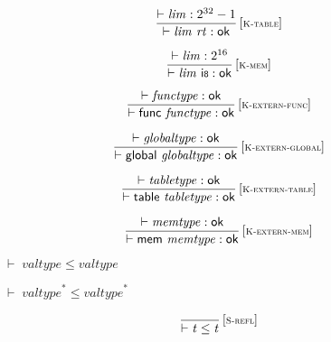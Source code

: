 $$
\begin{array}{@{}c@{}}\displaystyle
\frac{
{ \vdash }\;{\mathit{lim}} : {2^{32}} - 1
}{
{ \vdash }\;{\mathit{lim}}~{\mathit{rt}} : \mathsf{ok}
} \, {[\textsc{\scriptsize K{-}table}]}
\qquad
\end{array}
$$

$$
\begin{array}{@{}c@{}}\displaystyle
\frac{
{ \vdash }\;{\mathit{lim}} : {2^{16}}
}{
{ \vdash }\;{\mathit{lim}}~\mathsf{i{\scriptstyle8}} : \mathsf{ok}
} \, {[\textsc{\scriptsize K{-}mem}]}
\qquad
\end{array}
$$

\vspace{1ex}

$$
\begin{array}{@{}c@{}}\displaystyle
\frac{
{ \vdash }\;{\mathit{functype}} : \mathsf{ok}
}{
{ \vdash }\;\mathsf{func}~{\mathit{functype}} : \mathsf{ok}
} \, {[\textsc{\scriptsize K{-}extern{-}func}]}
\qquad
\end{array}
$$

$$
\begin{array}{@{}c@{}}\displaystyle
\frac{
{ \vdash }\;{\mathit{globaltype}} : \mathsf{ok}
}{
{ \vdash }\;\mathsf{global}~{\mathit{globaltype}} : \mathsf{ok}
} \, {[\textsc{\scriptsize K{-}extern{-}global}]}
\qquad
\end{array}
$$

$$
\begin{array}{@{}c@{}}\displaystyle
\frac{
{ \vdash }\;{\mathit{tabletype}} : \mathsf{ok}
}{
{ \vdash }\;\mathsf{table}~{\mathit{tabletype}} : \mathsf{ok}
} \, {[\textsc{\scriptsize K{-}extern{-}table}]}
\qquad
\end{array}
$$

$$
\begin{array}{@{}c@{}}\displaystyle
\frac{
{ \vdash }\;{\mathit{memtype}} : \mathsf{ok}
}{
{ \vdash }\;\mathsf{mem}~{\mathit{memtype}} : \mathsf{ok}
} \, {[\textsc{\scriptsize K{-}extern{-}mem}]}
\qquad
\end{array}
$$

\vspace{1ex}

\vspace{1ex}

$\boxed{{ \vdash }\;{\mathit{valtype}} \leq {\mathit{valtype}}}$

$\boxed{{ \vdash }\;{{\mathit{valtype}}^\ast} \leq {{\mathit{valtype}}^\ast}}$

$$
\begin{array}{@{}c@{}}\displaystyle
\frac{
}{
{ \vdash }\;{\mathit{t}} \leq {\mathit{t}}
} \, {[\textsc{\scriptsize S{-}refl}]}
\qquad
\end{array}
$$

